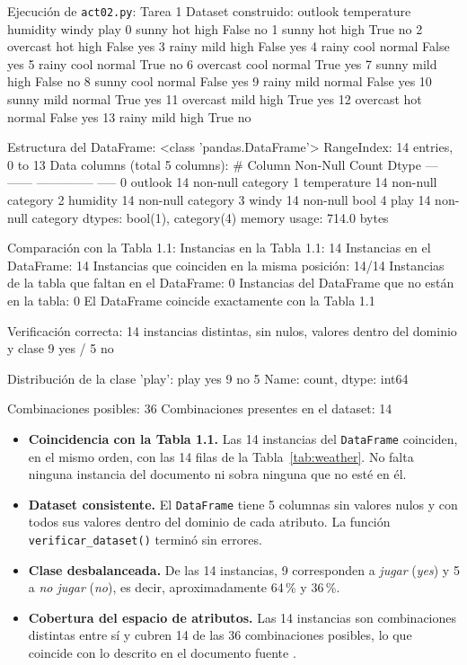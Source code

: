 \documentclass[11pt,letterpaper]{article}
\begin{document}
\begin{consola}[label=out:tarea1]{Ejecución de \texttt{act02.py}: Tarea 1}
Dataset construido:
     outlook temperature humidity  windy play
0      sunny         hot     high  False   no
1      sunny         hot     high   True   no
2   overcast         hot     high  False  yes
3      rainy        mild     high  False  yes
4      rainy        cool   normal  False  yes
5      rainy        cool   normal   True   no
6   overcast        cool   normal   True  yes
7      sunny        mild     high  False   no
8      sunny        cool   normal  False  yes
9      rainy        mild   normal  False  yes
10     sunny        mild   normal   True  yes
11  overcast        mild     high   True  yes
12  overcast         hot   normal  False  yes
13     rainy        mild     high   True   no

Estructura del DataFrame:
<class 'pandas.DataFrame'>
RangeIndex: 14 entries, 0 to 13
Data columns (total 5 columns):
 #   Column       Non-Null Count  Dtype
---  ------       --------------  -----
 0   outlook      14 non-null     category
 1   temperature  14 non-null     category
 2   humidity     14 non-null     category
 3   windy        14 non-null     bool
 4   play         14 non-null     category
dtypes: bool(1), category(4)
memory usage: 714.0 bytes

Comparación con la Tabla 1.1:
Instancias en la Tabla 1.1: 14
Instancias en el DataFrame: 14
Instancias que coinciden en la misma posición: 14/14
Instancias de la tabla que faltan en el DataFrame: 0
Instancias del DataFrame que no están en la tabla: 0
El DataFrame coincide exactamente con la Tabla 1.1

Verificación correcta: 14 instancias distintas, sin nulos, valores dentro del dominio y clase 9 yes / 5 no

Distribución de la clase 'play':
play
yes    9
no     5
Name: count, dtype: int64

Combinaciones posibles: 36
Combinaciones presentes en el dataset: 14
\end{consola}

\begin{itemize}
    \item \textbf{Coincidencia con la Tabla 1.1.} Las 14 instancias del \texttt{DataFrame} coinciden, en el mismo orden, con las 14 filas de la Tabla~\ref{tab:weather}. No falta ninguna instancia del documento ni sobra ninguna que no esté en él.
    \item \textbf{Dataset consistente.} El \texttt{DataFrame} tiene 5 columnas sin valores nulos y con todos sus valores dentro del dominio de cada atributo. La función \texttt{verificar\_dataset()} terminó sin errores.
    \item \textbf{Clase desbalanceada.} De las 14 instancias, 9 corresponden a \textit{jugar} (\textit{yes}) y 5 a \textit{no jugar} (\textit{no}), es decir, aproximadamente 64\,\% y 36\,\%.
    \item \textbf{Cobertura del espacio de atributos.} Las 14 instancias son combinaciones distintas entre sí y cubren 14 de las 36 combinaciones posibles, lo que coincide con lo descrito en el documento fuente \parencite{tecnm2026_documento_fuente}.
\end{itemize}
\end{document}
